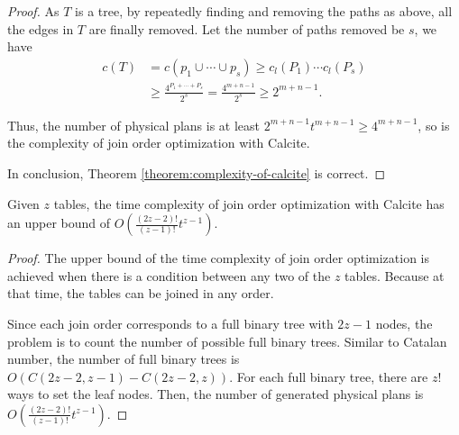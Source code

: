 \begin{proof}
    As $T$ is a tree, by repeatedly finding and removing the paths as above, all the edges in $T$ are finally removed.
    Let the number of paths removed be $s$, we have 
    \begin{equation*}
        \begin{split}
            c(T) & = c(p_1 \cup \cdots \cup p_s) \geq c_l(P_1) \cdots c_l(P_s) \\
            & \geq \frac{4^{P_1 + \cdots + P_s}}{2^s} = \frac{4^{m + n - 1}}{2^s} \geq 2^{m+n-1}.
        \end{split}
    \end{equation*}
    
    

    Thus, the number of physical plans is at least $2^{m+n-1}t^{m+n-1} \geq 4^{m+n-1}$, so is the complexity of join order optimization with Calcite.
   
    In conclusion, Theorem \ref{theorem:complexity-of-calcite} is correct.
\end{proof}

\begin{lemma}
    \label{lemma:upper-bound-of-calcite}
    Given $z$ tables, the time complexity of join order optimization with Calcite has an upper bound of $O(\frac{(2z-2)!}{(z-1)!}t^{z-1})$.
\end{lemma}
\begin{proof}
    The upper bound of the time complexity of join order optimization is achieved when there is a condition between any two of the $z$ tables.
    Because at that time, the tables can be joined in any order.

    Since each join order corresponds to a full binary tree with $2z-1$ nodes, the problem is to count the number of possible full binary trees.
    Similar to Catalan number, the number of full binary trees is $O(C(2z-2, z-1) - C(2z-2, z))$.
    For each full binary tree, there are $z!$ ways to set the leaf nodes. 
    Then, the number of generated physical plans is $O(\frac{(2z-2)!}{(z-1)!}t^{z-1})$.
\end{proof}


